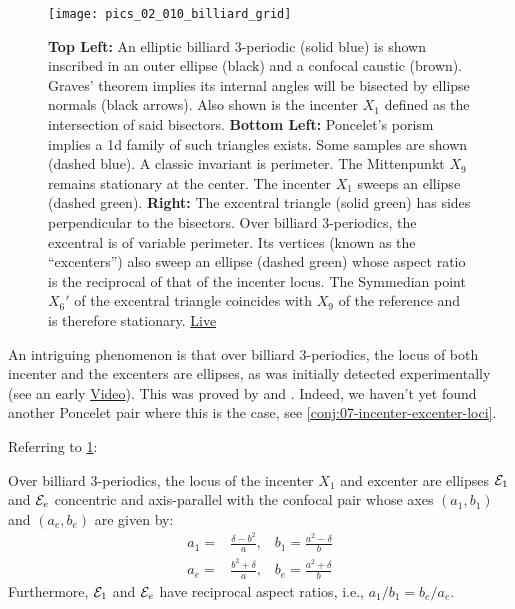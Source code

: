 \begin{figure}
    \centering
    \texttt{[image: pics\_02\_010\_billiard\_grid]}
    \caption{\textbf{Top Left:} An elliptic billiard 3-periodic (solid blue) is shown inscribed in an outer ellipse (black) and a confocal caustic (brown). Graves' theorem implies its internal angles will be bisected by ellipse normals (black arrows). Also shown is the incenter $X_1$ defined as the intersection of said bisectors. \textbf{Bottom Left:} Poncelet's porism implies a 1d family of such triangles exists. Some samples are shown (dashed blue). A classic invariant is  perimeter. The Mittenpunkt $X_9$ remains stationary at the center. The incenter $X_1$ sweeps an ellipse (dashed green). \textbf{Right:} The excentral triangle (solid green) has sides perpendicular to the bisectors. Over billiard 3-periodics, the excentral is of variable perimeter. Its vertices (known as the ``excenters'') also sweep an ellipse (dashed green) whose aspect ratio is the reciprocal of that of the incenter locus. The Symmedian point $X_6'$ of the excentral triangle coincides with $X_9$ of the reference and is therefore stationary. \href{https://bit.ly/3gWl3CI}{Live}}
    \label{fig:billiard-grid}
\end{figure}

An intriguing phenomenon is that over billiard 3-periodics, the locus of both incenter and the excenters are ellipses, as was initially detected experimentally (see an early \href{https://youtu.be/BBsyM7RnswA}{Video}). This was proved by \cite{olga14} and \cite{garcia2019-incenter}. Indeed, we haven't yet found another Poncelet pair where this is the case, see \cref{conj:07-incenter-excenter-loci}.

Referring to \cref{fig:billiard-grid}:

\begin{theorem}
Over billiard 3-periodics, the locus of the incenter $X_1$ and excenter are ellipses $\mathcal{E}_1$ and $\mathcal{E}_e$ concentric and axis-parallel with the confocal pair whose axes $(a_1,b_1)$ and $(a_e,b_e)$ are given by:
\begin{align*}
a_1 =& \frac{\delta-b^2 }{a},\;\;\;b_1=\frac{a^2-\delta}{b}\\ 
a_e= &\frac{{b}^{2}+\delta}{a},\;\;\;b_e=\frac{{a}^{2}+\delta}{b}
\end{align*}
Furthermore, $\mathcal{E}_1$ and $\mathcal{E}_e$ have reciprocal aspect ratios, i.e., $a_1/b_1=b_e/a_e$.
\label{thm:02-incenter-excenter}
\end{theorem}

